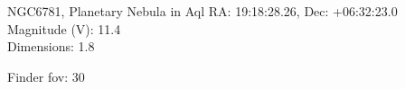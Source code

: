 \begin{block}{NGC6781, Planetary Nebula in Aql}
    RA: 19:18:28.26, Dec: +06:32:23.0 \\ 
    Magnitude (V): 11.4 \\ 
    Dimensions: 1.8 

    Finder fov: 30 
\end{block}